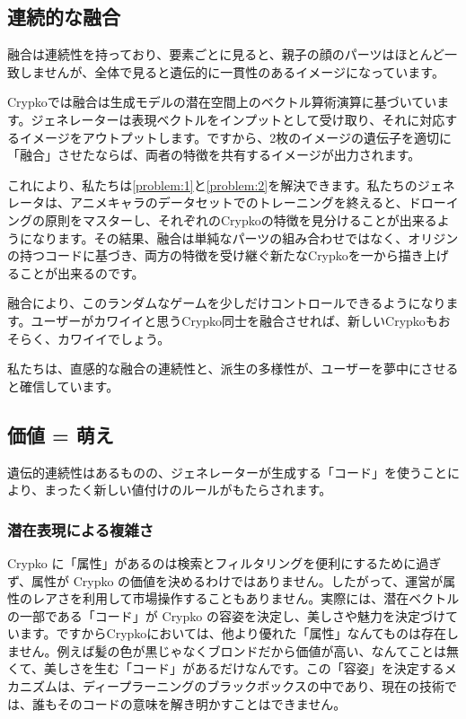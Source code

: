 \documentclass[a4paper]{article}
\begin{document}
\subsection{連続的な融合}
融合は連続性を持っており、要素ごとに見ると、親子の顔のパーツはほとんど一致しませんが、全体で見ると遺伝的に一貫性のあるイメージになっています。

Crypkoでは融合は生成モデルの潜在空間上のベクトル算術演算\cite{radford2015unsupervised}に基づいています。ジェネレーターは表現ベクトルをインプットとして受け取り、それに対応するイメージをアウトプットします。ですから、2枚のイメージの遺伝子を適切に「融合」させたならば、両者の特徴を共有するイメージが出力されます。

これにより、私たちは\ref{problem:1}と\ref{problem:2}を解決できます。私たちのジェネレータは、アニメキャラのデータセットでのトレーニングを終えると、ドローイングの原則をマスターし、それぞれのCrypkoの特徴を見分けることが出来るようになります。その結果、融合は単純なパーツの組み合わせではなく、オリジンの持つコードに基づき、両方の特徴を受け継ぐ新たなCrypkoを一から描き上げることが出来るのです。

融合により、このランダムなゲームを少しだけコントロールできるようになります。ユーザーがカワイイと思うCrypko同士を融合させれば、新しいCrypkoもおそらく、カワイイでしょう。

私たちは、直感的な融合の連続性と、派生の多様性が、ユーザーを夢中にさせると確信しています。

\subsection{価値 = 萌え}

遺伝的連続性はあるものの、ジェネレーターが生成する「コード」を使うことにより、まったく新しい値付けのルールがもたらされます。

\subsubsection{潜在表現による複雑さ}

Crypko に「属性」があるのは検索とフィルタリングを便利にするために過ぎず、属性が Crypko の価値を決めるわけではありません。したがって、運営が属性のレアさを利用して市場操作することもありません。実際には、潜在ベクトルの一部である「コード」が Crypko の容姿を決定し、美しさや魅力を決定づけています。ですからCrypkoにおいては、他より優れた「属性」なんてものは存在しません。例えば髪の色が黒じゃなくブロンドだから価値が高い、なんてことは無くて、美しさを生む「コード」があるだけなんです。この「容姿」を決定するメカニズムは、ディープラーニングのブラックボックスの中であり、現在の技術では、誰もそのコードの意味を解き明かすことはできません。
\end{document}
